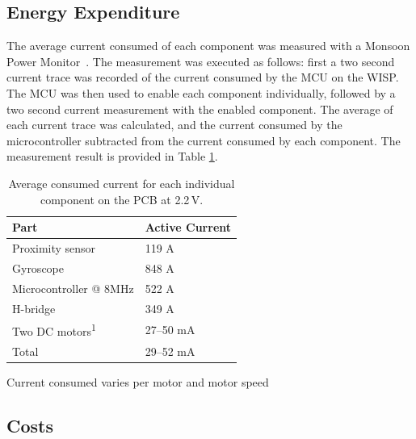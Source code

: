 \subsection{Energy Expenditure}

The average current consumed of each component was measured with a Monsoon Power Monitor~\cite{monsoon_powermonitor_2017}.
The measurement was executed as follows: first a two second current trace was recorded of the current consumed by the MCU on the WISP.
The MCU was then used to enable each component individually, followed by a two second current measurement with the enabled component.
The average of each current trace was calculated, and the current consumed by the microcontroller subtracted from the current consumed by each component.
The measurement result is provided in Table \ref{tab:avg_cur_comp}.


\begin{table}[t]
	\centering
	\begin{threeparttable}
		\caption{Average consumed current for each individual component on the PCB at 2.2\,V.}
		\label{tab:avg_cur_comp}
		\begin{tabular}{|l|l|} 
			\hline
			Part & Active Current \\
			\hline\hline
			Proximity sensor & 119 \textmu A \\
			Gyroscope & 848 \textmu A\\	
			Microcontroller @ 8MHz & 522 \textmu A\\
			H-bridge & 349 \textmu A \\
			Two DC motors\textsuperscript{1} & 27--50 mA  \\
			\hline \hline
			Total & 29--52 mA \\
			\hline
		\end{tabular}
		\begin{tablenotes}
		\small
		\item [1] Current consumed varies per motor and motor speed
		\end{tablenotes}
	\end{threeparttable}
\end{table}

\subsection{Costs}


